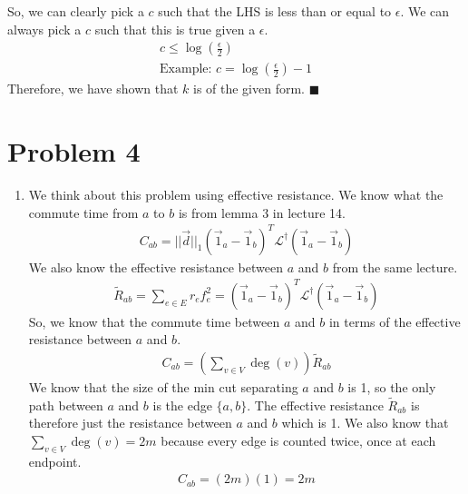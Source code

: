 \documentclass[12pt,a4paper]{article}
\begin{document}
	So, we can clearly pick a $c$ such that the LHS is less than or equal to $\epsilon$. We can always pick a $c$ such that this is true given a $\epsilon$. 
	\begin{gather*}
		c \leq \log \left( \frac{\epsilon}{2}\right)\\
		\text{Example: } c = \log \left( \frac{\epsilon}{2}\right) - 1
	\end{gather*}
	Therefore, we have shown that $k$ is of the given form.
	$\blacksquare$
	
	\section*{Problem 4}
	\begin{enumerate}[label=\alph*.]
		\item We think about this problem using effective resistance. We know what the commute time from $a$ to $b$ is from lemma 3 in lecture 14.
		\begin{gather*}
			C_{ab} = ||\vec{d}||_1 (\vec{1}_a - \vec{1}_b)^T  \mathcal{L}^\dagger (\vec{1}_a - \vec{1}_b)
		\end{gather*}
		We also know the effective resistance between $a$ and $b$ from the same lecture.
		\begin{gather*}
			\tilde{R}_{ab} = \sum_{e \in E} r_e f_e^2 = (\vec{1}_a - \vec{1}_b)^T  \mathcal{L}^\dagger (\vec{1}_a - \vec{1}_b)
		\end{gather*}
		So, we know that the commute time between $a$ and $b$ in terms of the effective resistance between $a$ and $b$. 
		\begin{gather*}
			C_{ab} = \left( \sum_{v \in V} \deg(v) \right) \tilde{R}_{ab}
		\end{gather*}
		We know that the size of the min cut separating $a$ and $b$ is 1, so the only path between $a$ and $b$ is the edge $\{a, b\}$. The effective resistance $\tilde{R}_{ab}$ is therefore just the resistance between $a$ and $b$ which is 1. We also know that $\sum_{v \in V} \deg(v) =2m$ because every edge is counted twice, once at each endpoint. 
		\begin{gather*}
		C_{ab} = (2m) (1) = 2m
		\end{gather*}
		

\end{enumerate}
\end{document}
